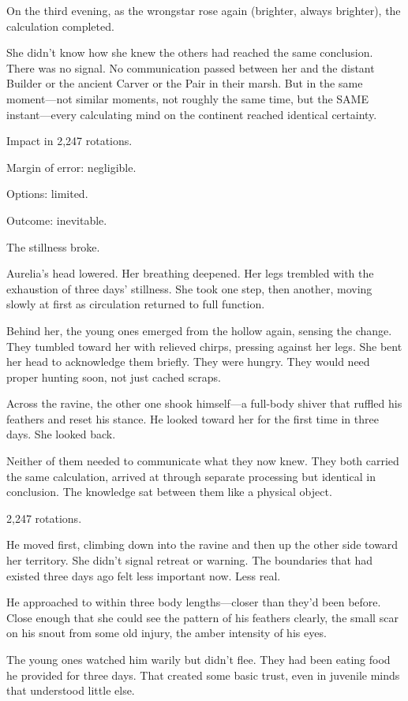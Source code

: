On the third evening, as the wrongstar rose again (brighter, always brighter), the calculation completed.

She didn't know how she knew the others had reached the same conclusion. There was no signal. No communication passed between her and the distant Builder or the ancient Carver or the Pair in their marsh. But in the same moment—not similar moments, not roughly the same time, but the SAME instant—every calculating mind on the continent reached identical certainty.

Impact in 2,247 rotations.

Margin of error: negligible.

Options: limited.

Outcome: inevitable.

The stillness broke.

Aurelia's head lowered. Her breathing deepened. Her legs trembled with the exhaustion of three days' stillness. She took one step, then another, moving slowly at first as circulation returned to full function.

Behind her, the young ones emerged from the hollow again, sensing the change. They tumbled toward her with relieved chirps, pressing against her legs. She bent her head to acknowledge them briefly. They were hungry. They would need proper hunting soon, not just cached scraps.

Across the ravine, the other one shook himself—a full-body shiver that ruffled his feathers and reset his stance. He looked toward her for the first time in three days. She looked back.

Neither of them needed to communicate what they now knew. They both carried the same calculation, arrived at through separate processing but identical in conclusion. The knowledge sat between them like a physical object.

2,247 rotations.

He moved first, climbing down into the ravine and then up the other side toward her territory. She didn't signal retreat or warning. The boundaries that had existed three days ago felt less important now. Less real.

He approached to within three body lengths—closer than they'd been before. Close enough that she could see the pattern of his feathers clearly, the small scar on his snout from some old injury, the amber intensity of his eyes.

The young ones watched him warily but didn't flee. They had been eating food he provided for three days. That created some basic trust, even in juvenile minds that understood little else.

